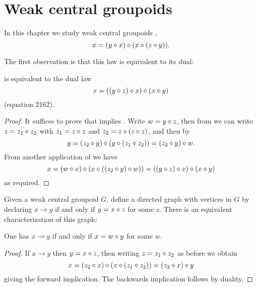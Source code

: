 \chapter{Weak central groupoids}\label{weak-central-groupoids-chapter}
In this chapter we study weak central groupoids ,
\begin{equation}\label{1485}
  x = (y \diamond x) \diamond (x \diamond (z \diamond y)).
\end{equation}

The first observation is that this law is equivalent to its dual:

\begin{lemma}[1485 equivalent to 2162]\label{1485-dual}\leanok{}
   is equivalent to the dual law
  \begin{equation}\label{2162}
   x = ((y \diamond z) \diamond x) \diamond (x \diamond y)
  \end{equation}
  (equation 2162).
\end{lemma}

\begin{proof}
  It suffices to prove that  implies . Write $w = y \diamond z$, then from  we can write $z = z_1 \diamond z_2$ with $z_1 = z \diamond z$ and $z_2 = z \diamond (z \diamond z)$, and then by 
  $$ y = (z_2 \diamond y) \diamond (y \diamond (z_1 \diamond z_2)) = (z_2 \diamond y) \diamond w.$$
  From another application of  we have
  $$ x = (w \diamond x) \diamond (x \diamond ((z_2 \diamond y) \diamond w)) = ((y \diamond z) \diamond x) \diamond (x \diamond y)$$
  as required.
\end{proof}

Given a weak central groupoid $G$, define a directed graph with vertices in $G$ by declaring $x \to y$ if and only if $y = x \diamond z$ for some $z$. There is an equivalent characterization of this graph:

\begin{lemma}\label{graph-dual}\leanok{}
  One has $x \to y$ if and only if $x = w \diamond y$ for some $w$.
\end{lemma}

\begin{proof}
  If $x \to y$ then $y = x \diamond z$, then writing $z = z_1 \diamond z_2$ as before we obtain
  $$ x = (z_2 \diamond x) \diamond (x \diamond (z_1 \diamond z_2)) = (z_2 \diamond x) \diamond y$$
  giving the forward implication. The backwards implication follows by duality.
\end{proof}

